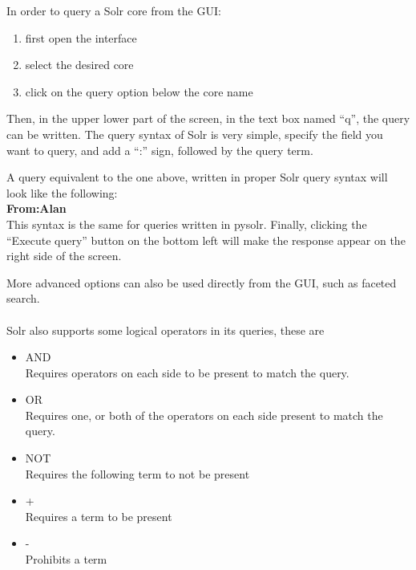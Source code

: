 \documentclass[a4paper,english]{report}
\begin{document}
In order to query a Solr core from the GUI:

\begin{enumerate}

\item first open the interface
\item select the desired core
\item click on the query option below the core name

\end{enumerate}
Then, in the upper lower part of the screen, in the text box named “q”, the query can be written. 
The query syntax of Solr is very simple, specify the field you want to query, and add a “:” sign, followed by the query term. 

A query equivalent to the one above, written in proper Solr query syntax will look like the following:\\


\textbf{From:Alan}\\


This syntax is the same for queries written in pysolr.
Finally, clicking the “Execute query” button on the bottom left will make the  response appear on the right side of the screen.

More advanced options can also be used directly from the GUI, such as faceted search.\\\\


Solr also supports some logical operators in its queries, these are 

\begin{itemize}
\item AND\\
 Requires operators on each side to be present to match the query.

\item OR\\
Requires one, or both of the operators on each side present to match the query.


\item NOT \\
Requires the following term to not be present 


\item + \\
Requires a term to be present 

\item - \\
Prohibits a term 

\end{itemize}
\end{document}
